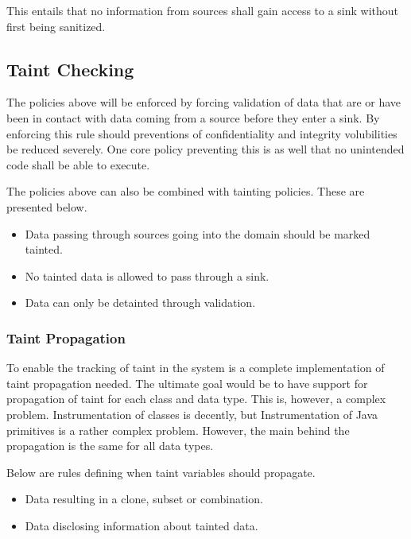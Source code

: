 This entails that no information from sources shall gain access to a sink without first being sanitized.



\subsection{Taint Checking}
The policies above will be enforced by forcing validation of data that are or have been in contact with data coming from a source before they enter a sink. By enforcing this rule should preventions of confidentiality and integrity volubilities be reduced severely. One core policy preventing this is as well that no unintended code shall be able to execute.

The policies above can also be combined with tainting policies. These are presented below.

\hfill
\begin{itemize}
    \item Data passing through sources going into the domain should be marked tainted.
    \item No tainted data is allowed to pass through a sink.
    \item Data can only be detainted through validation.
\end{itemize}
\hfill



\subsubsection{Taint Propagation}
To enable the tracking of taint in the system is a complete implementation of taint propagation needed. The ultimate goal would be to have support for propagation of taint for each class and data type. This is, however, a complex problem. Instrumentation of classes is decently, but Instrumentation of Java primitives is a rather complex problem. However, the main behind the propagation is the same for all data types. 

Below are rules defining when taint variables should propagate.

\hfill
\begin{itemize}
    \item Data resulting in a clone, subset or combination.
    \item Data disclosing information about tainted data.
\end{itemize}
\hfill



